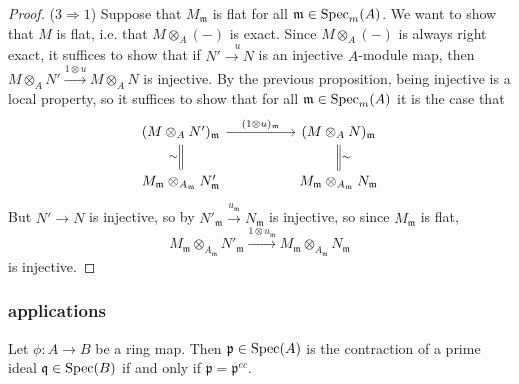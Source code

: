 \documentclass[12pt]{article}
\begin{document}
\begin{proof}
	($3\Rightarrow 1$) Suppose that $M_\mathfrak{m}$ is flat for all $\mathfrak{m}\in\text{Spec}_m(A)$. We want to show that $M$ is flat, i.e. that $M\otimes_A (-)$ is exact. Since $M\otimes_A (-)$ is always right exact, it suffices to show that if $N'\overset{u}{\to N}$ is an injective $A$-module map, then $M\otimes_A N' \overset{1\otimes u}{\to} M\otimes_A N$ is injective. By the previous proposition, being injective is a local property, so it suffices to show that for all $\mathfrak{m}\in\text{Spec}_m(A)$ it is the case that 
	\begin{equation*}
\begin{tikzcd}
(M\otimes_A N')_\mathfrak{m} \arrow[rr, "(1\otimes u)_\mathfrak{m}"]                         &  & (M\otimes_A N)_\mathfrak{m}                                                                  \\
M_\mathfrak{m}\otimes_{A_\mathfrak{m}}N'_\mathfrak{m} \arrow[u, "\sim", Rightarrow, no head] &  & M_\mathfrak{m}\otimes_{A_\mathfrak{m}}N_\mathfrak{m} \arrow[u, "\sim"', Rightarrow, no head]
\end{tikzcd}
	\end{equation*}
	But $N'\to N$ is injective, so by  $N'_\mathfrak{m}\overset{u_\mathfrak{m}}{\to}N_\mathfrak{m}$ is injective, so since $M_\mathfrak{m}$ is flat, 
	\begin{equation*}
		M_\mathfrak{m}\otimes_{A_\mathfrak{m}} N'_\mathfrak{m} \overset{1\otimes u_\mathfrak{m}}{\longrightarrow} M_\mathfrak{m}\otimes_{A_\mathfrak{m}}N_\mathfrak{m}
	\end{equation*}
	is injective.
\end{proof}

\subsubsection{applications} %

\begin{proposition}
	Let $\phi:A\to B$ be a ring map. Then $\mathfrak{p}\in\text{Spec}(A)$ is the contraction of a prime ideal $\mathfrak{q}\in\text{Spec}(B)$ if and only if $\mathfrak{p}=\mathfrak{p}^{ec}$. 
\end{proposition}
\end{document}
